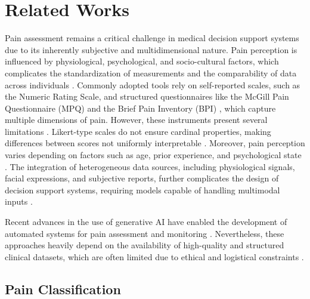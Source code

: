 \documentclass[preprint,12pt,authoryear]{elsarticle}
\begin{document}
\section{Related Works}\label{sec:relatedworks}
Pain assessment remains a critical challenge in medical decision support systems due to its inherently subjective and multidimensional nature. Pain perception is influenced by physiological, psychological, and socio-cultural factors, which complicates the standardization of measurements and the comparability of data across individuals \citep{ozek2024uncertainty}. Commonly adopted tools rely on self-reported scales, such as the Numeric Rating Scale, and structured questionnaires like the McGill Pain Questionnaire (MPQ) and the Brief Pain Inventory (BPI) \citep{cleeland1994pain}, which capture multiple dimensions of pain. However, these instruments present several limitations \citep{melzack1975mcgill,dudgeon1993short,gauthier2014validation}. Likert-type scales do not ensure cardinal properties, making differences between scores not uniformly interpretable \citep{norman2010likert,jamieson2004likert}. Moreover, pain perception varies depending on factors such as age, prior experience, and psychological state \citep{rotton1996effects, goodman2003mothers, helme2001epidemiology}. The integration of heterogeneous data sources, including physiological signals, facial expressions, and subjective reports, further complicates the design of decision support systems, requiring models capable of handling multimodal inputs \citep{robinson2004prior, serraoui2023painanalysisusingadaptive}.

Recent advances in the use of generative AI have enabled the development of automated systems for pain assessment and monitoring \citep{nanni2010local, jiang2024personalized}. Nevertheless, these approaches heavily depend on the availability of high-quality and structured clinical datasets, which are often limited due to ethical and logistical constraints \citep{cascella2026digital}. 



\subsection{Pain Classification}
\end{document}
